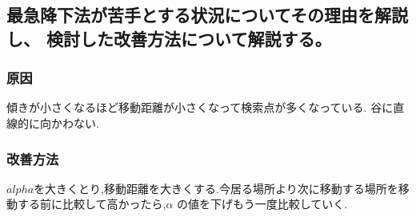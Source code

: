 \subsection{最急降下法が苦手とする状況についてその理由を解説し、
検討した改善方法について解説する。}
\subsubsection{原因}
傾きが小さくなるほど移動距離が小さくなって検索点が多くなっている.
谷に直線的に向かわない.
\subsubsection{改善方法}
$alpha$を大きくとり,移動距離を大きくする.今居る場所より次に移動する場所を移動する前に比較して高かったら,$\alpha$
の値を下げもう一度比較していく.
